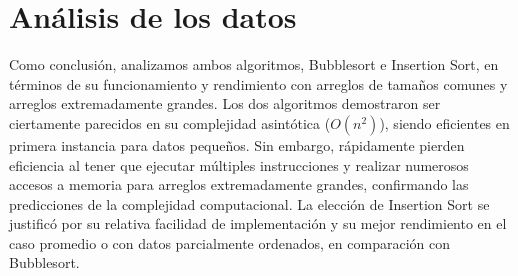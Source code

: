 \documentclass{article}
\begin{document}
\section{Análisis de los datos}
Como conclusión, analizamos ambos algoritmos, Bubblesort e Insertion Sort, en términos de su funcionamiento y rendimiento con arreglos de tamaños comunes y arreglos extremadamente grandes. Los dos algoritmos demostraron ser ciertamente parecidos en su complejidad asintótica ($O(n^2)$), siendo eficientes en primera instancia para datos pequeños. Sin embargo, rápidamente pierden eficiencia al tener que ejecutar múltiples instrucciones y realizar numerosos accesos a memoria para arreglos extremadamente grandes, confirmando las predicciones de la complejidad computacional. La elección de Insertion Sort se justificó por su relativa facilidad de implementación y su mejor rendimiento en el caso promedio o con datos parcialmente ordenados, en comparación con Bubblesort.
\end{document}
